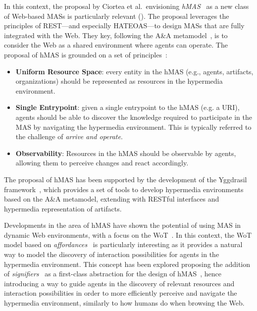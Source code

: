 In this context, the proposal by Ciortea et al.\ envisioning \emph{\ac{hMAS}}~\cite{Ciortea_Mayer_Gandon_Boissier_Ricci_Zimmermann_2019} as a new class of Web-based \acp{MAS} is particularly relevant ().
%
The proposal leverages the principles of \ac{REST}---and especially \ac{HATEOAS}---to design \acp{MAS} that are fully integrated with the Web.
%
They key, following the A\&A metamodel~\cite{Omicini_Ricci_Viroli_2008}, is to consider the Web as a shared environment where agents can operate.
%
The proposal of \ac{hMAS} is grounded on a set of principles~\cite{Ciortea_Boissier_Ricci_2019}:
\begin{itemize}
    \item \textbf{Uniform Resource Space}: every entity in the \ac{hMAS} (e.g., agents, artifacts, organizations) should be represented as resources in the hypermedia environment. 
    \item \textbf{Single Entrypoint}: given a single entrypoint to the \ac{hMAS} (e.g. a \ac{URI}), agents should be able to discover the knowledge required to participate in the \ac{MAS} by navigating the hypermedia environment. This is typically referred to the challenge of \emph{arrive and operate}.
    \item \textbf{Observability}: Resources in the \ac{hMAS} should be observable by agents, allowing them to perceive changes and react accordingly. 
\end{itemize}
%
The proposal of \ac{hMAS} has been supported by the development of the Yggdrasil framework~\cite{Ciortea_Boissier_Ricci_2019}, which provides a set of tools to develop hypermedia environments based on the A\&A metamodel, extending \cartago{} with \ac{REST}ful interfaces and hypermedia representation of artifacts. 

Developments in the area of \ac{hMAS} have shown the potential of using \ac{MAS} in dynamic Web environments, with a focus on the \ac{WoT}~\cite{Ciortea_Mayer_Michahelles_2018}.
%
In this context, the \ac{WoT} model based on \emph{affordances}~\cite{Norman_2013} is particularly interesting as it provides a natural way to model the discovery of interaction possibilities for agents in the hypermedia environment.
%
This concept has been explored proposing the addition of \emph{signifiers}~\cite{Norman_2008} as a first-class abstraction for the design of \ac{hMAS}~\cite{Vachtsevanou_Ciortea_Mayer_Lemée_2023}, hence introducing a way to guide agents in the discovery of relevant resources and interaction possibilities in order to more efficiently perceive and navigate the hypermedia environment, similarly to how humans do when browsing the Web. 

